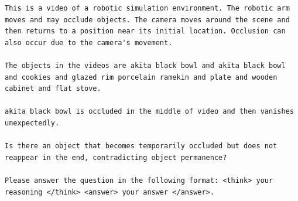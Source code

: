 \begin{tcolorbox}[colback=nvidiagreen!3,colframe=nvidiagreen!75!white,title=\textsc{Object Permanence Reasoning Extraction Prompt},left=0.5ex,right=0.5ex,top=0.5ex,bottom=0.5ex]
\fontsize{9.}{9.}\selectfont
\begin{Verbatim}[breaklines=true, breaksymbolleft={}, breaksymbolright={}]
This is a video of a robotic simulation environment. The robotic arm moves and may occlude objects. The camera moves around the scene and then returns to a position near its initial location. Occlusion can also occur due to the camera's movement.

The objects in the videos are akita black bowl and akita black bowl and cookies and glazed rim porcelain ramekin and plate and wooden cabinet and flat stove.

akita black bowl is occluded in the middle of video and then vanishes unexpectedly.

Is there an object that becomes temporarily occluded but does not reappear in the end, contradicting object permanence?

Please answer the question in the following format: <think> your reasoning </think> <answer> your answer </answer>.
\end{Verbatim}
\label{prompt:permanence_reasoning_prompt}
\end{tcolorbox}
